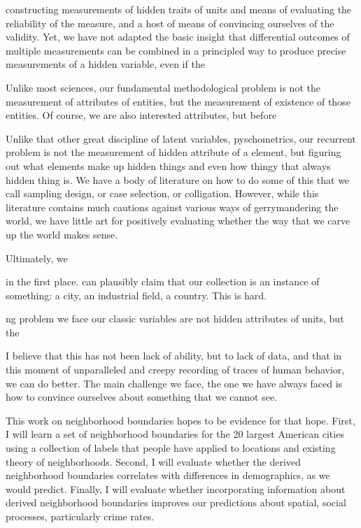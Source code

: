 \documentclass{article}
\begin{document}
constructing measurements of hidden traits of units and means of
evaluating the reliability of the measure, and a host of means of
convincing ourselves of the validity. Yet, we have not adapted the
basic insight that differential outcomes of multiple measurements can
be combined in a principled way to produce precise measurements of a
hidden variable, even if the









Unlike most sciences, our fundamental methodological problem is not
the measurement of attributes of entities, but the measurement of
existence of those entities. Of course, we are also interested
attributes, but before

Unlike that other great discipline of latent variables, pyschometrics,
our recurrent problem is not the measurement of hidden attribute of a
element, but figuring out what elements make up hidden things and even
how thingy that always hidden thing is.  We have a body of literature
on how to do some of this that we call sampling design, or case
selection, or colligation. However, while this literature contains
much cautions against various ways of gerrymandering the world, we
have little art for positively evaluating whether the way that we
carve up the world makes sense.


Ultimately, we 





in the first
place. can plausibly claim that our collection is an instance of
something: a city, an industrial field, a country. This is hard.



ng problem we face
our classic variables are not hidden attributes of units, but the

I believe that this has not been lack of ability, but to lack of data,
and that in this moment of unparalleled and creepy recording of traces
of human behavior, we can do better. The main challenge we face, the
one we have always faced is how to convince ourselves about something
that we cannot see.

This work on neighborhood boundaries hopes to be evidence for that
hope. First, I will learn a set of neighborhood boundaries for the 20
largest American cities using a collection of labels that people have
applied to locations and existing theory of neighborhoods. Second, I
will evaluate whether the derived neighborhood boundaries correlates
with differences in demographics, as we would predict. Finally, I will
evaluate whether incorporating information about derived neighborhood
boundaries improves our predictions about spatial, social processes,
particularly crime rates.
\end{document}
